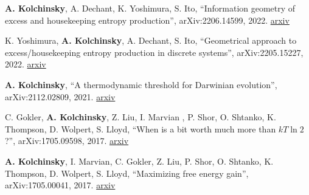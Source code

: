 
\textbf{A. Kolchinsky}, A. Dechant, K. Yoshimura, S. Ito, 
``Information geometry of excess and housekeeping entropy production'', arXiv:2206.14599, 2022. \href{https://arxiv.org/abs/2206.14599}{arxiv}


K. Yoshimura, \textbf{A. Kolchinsky}, A. Dechant, S. Ito, 
``Geometrical approach to excess/housekeeping entropy production in discrete systems'', arXiv:2205.15227, 2022. \href{https://arxiv.org/abs/2205.15227}{arxiv}

\textbf{A. Kolchinsky}, ``A thermodynamic threshold for Darwinian evolution'', arXiv:2112.02809, 2021. \href{http://arxiv.org/abs/2112.02809}{arxiv} 

C. Gokler, \textbf{A. Kolchinsky}, Z. Liu, I. Marvian , P. Shor, O. Shtanko, K. Thompson, D. Wolpert, S. Lloyd, ``When is a bit worth much more than $kT \ln 2$?'', arXiv:1705.09598, 2017. \href{https://arxiv.org/abs/1705.09598}{arxiv}

\textbf{A. Kolchinsky}, I. Marvian, C. Gokler, Z. Liu, P. Shor, O. Shtanko, K. Thompson, D. Wolpert, S. Lloyd, ``Maximizing free energy gain'', arXiv:1705.00041, 2017. \href{https://arxiv.org/abs/1705.00041}{arxiv}

